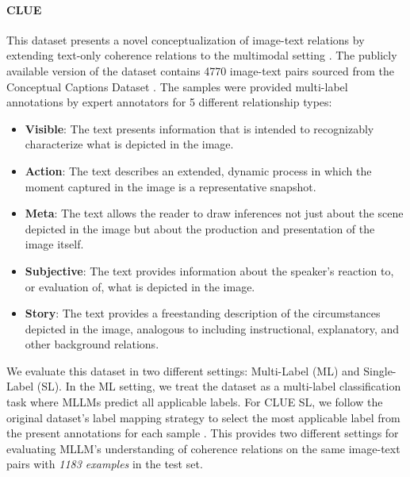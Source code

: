 \paragraph{CLUE} \label{clue-labels}
This dataset presents a novel conceptualization of image-text relations by extending text-only coherence relations to the multimodal setting \cite{Alikhani2020-nr}. The publicly available version of the dataset contains 4770 image-text pairs sourced from the Conceptual Captions Dataset \cite{Sharma2018-tr}. The samples were provided multi-label annotations by expert annotators for 5 different relationship types:

\begin{itemize}[leftmargin=3.3mm]
    \item \textbf{Visible}: The text presents information that is intended to recognizably characterize what is depicted in the image.
    \item \textbf{Action}: The text describes an extended, dynamic process in which the moment captured in the image is a representative snapshot.
    \item \textbf{Meta}: The text allows the reader to draw inferences not just about the scene depicted in the image but about the production and presentation of the image itself.
    \item \textbf{Subjective}: The text provides information about the speaker's reaction to, or evaluation of, what is depicted in the image.
    \item \textbf{Story}: The text provides a freestanding description of the circumstances depicted in the image, analogous to including instructional, explanatory, and other background relations.
\end{itemize}

We evaluate this dataset in two different settings: Multi-Label (ML) and Single-Label (SL). In the ML setting, we treat the dataset as a multi-label classification task where MLLMs predict all applicable labels. For CLUE SL, we follow the original dataset's label mapping strategy to select the most applicable label from the present annotations for each sample \cite{Alikhani2020-nr}. This provides two different settings for evaluating MLLM's understanding of coherence relations on the same image-text pairs with \textit{1183 examples} in the test set. 

